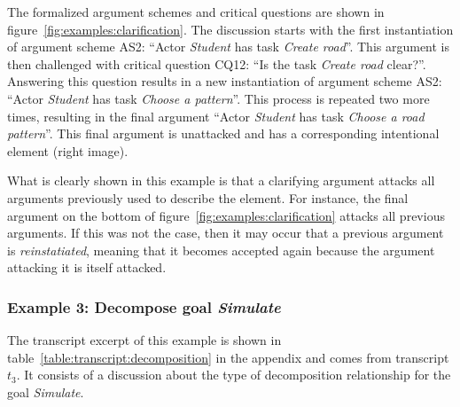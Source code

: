 The formalized argument schemes and critical questions are shown in figure~\ref{fig:examples:clarification}. The discussion starts with the first instantiation of argument scheme AS2: ``Actor \emph{Student} has task \emph{Create road}''. This argument is then challenged with critical question CQ12: ``Is the task \emph{Create road} clear?''. Answering this question results in a new instantiation of argument scheme AS2: ``Actor \emph{Student} has task \emph{Choose a pattern}''. This process is repeated two more times, resulting in the final argument ``Actor \emph{Student} has task \emph{Choose a road pattern}''. This final argument is unattacked and has a corresponding intentional element (right image). 

What is clearly shown in this example is that a clarifying argument attacks all arguments previously used to describe the element. For instance, the final argument on the bottom of figure~\ref{fig:examples:clarification} attacks all previous arguments. If this was not the case, then it may occur that a previous argument is \emph{reinstatiated}, meaning that it becomes accepted again because the argument attacking it is itself attacked.

\subsubsection{Example 3: Decompose goal \emph{Simulate}}

The transcript excerpt of this example is shown in table~\ref{table:transcript:decomposition} in the appendix and comes from transcript $t_3$. It consists of a discussion about the type of decomposition relationship for the goal \emph{Simulate}.

